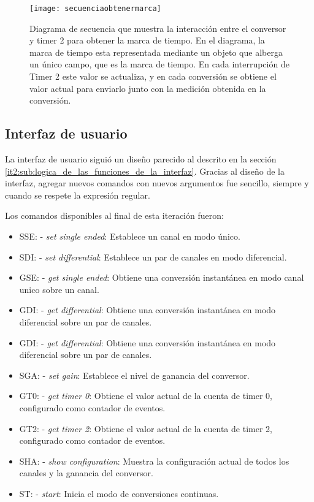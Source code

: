 \begin{figure}[h]
  \centering
  \texttt{[image: secuenciaobtenermarca]}
  \caption[Diagrama de secuencia para la obtención de una marca de tiempo]{Diagrama de secuencia que muestra la interacción entre el conversor y timer 2 para obtener la marca de tiempo. En el diagrama, la marca de tiempo esta representada mediante un objeto que alberga un único campo, que es la marca de tiempo. En cada interrupción de Timer 2 este valor se actualiza, y en cada conversión se obtiene el valor actual para enviarlo junto con la medición obtenida en la conversión.}\label{it5:fig:secuenciaobtenermarca}
\end{figure}



\subsection{Interfaz de usuario} %
\label{it5:sub:interfaz_de_usuario}

La interfaz de usuario siguió un diseño parecido al descrito en la sección \ref{it2:sub:logica_de_las_funciones_de_la_interfaz}. Gracias al diseño de la interfaz, agregar nuevos comandos con nuevos argumentos fue sencillo, siempre y cuando se respete la expresión regular.

Los comandos disponibles al final de esta iteración fueron:

\begin{itemize}
  \item SSE: - \textit{set single ended}: Establece un canal en modo único.
  \item SDI: - \textit{set differential}: Establece un par de canales en modo diferencial.
  \item GSE: - \textit{get single ended}: Obtiene una conversión instantánea en modo canal unico sobre un canal.
  \item GDI: - \textit{get differential}: Obtiene una conversión instantánea en modo diferencial sobre un par de canales.
  \item GDI: - \textit{get differential}: Obtiene una conversión instantánea en modo diferencial sobre un par de canales.
  \item SGA: - \textit{set gain}: Establece el nivel de ganancia del conversor.
  \item GT0: - \textit{get timer 0}: Obtiene el valor actual de la cuenta de timer 0, configurado como contador de eventos.
  \item GT2: - \textit{get timer 2}: Obtiene el valor actual de la cuenta de timer 2, configurado como contador de eventos.
  \item SHA: - \textit{show configuration}: Muestra la configuración actual de todos los canales y la ganancia del conversor.
  \item ST: - \textit{start}: Inicia el modo de conversiones continuas.
\end{itemize}

